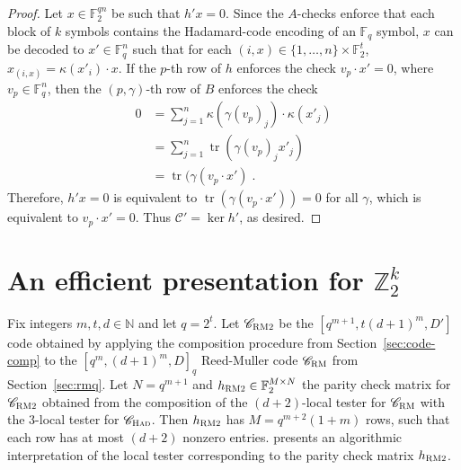 \documentclass[11pt]{article}
\theoremstyle{definition}
\newcommand{\code}{\mathscr{C}}
\newcommand{\N}{\ensuremath{\mathbb{N}}}
\newcommand{\F}{\ensuremath{\mathbb{F}}}
\newcommand{\Z}{\ensuremath{\mathbb{Z}}}
\newcommand{\RM}{\ensuremath{\textsc{RM}}}
\newcommand{\bRM}{\ensuremath{\textsc{RM2}}}
\newcommand{\had}{\textsc{Had}}
\DeclareMathOperator{\tr}{tr}
\begin{document}
\begin{proof}
Let $x\in \F_2^{qn}$ be such that $h'x=0$. Since the $A$-checks enforce that each block of $k$ symbols contains the Hadamard-code encoding of an $\F_q$ symbol, $x$ can be decoded to $x'\in \F_q^n$ such that for each $(i,x)\in \{1,\ldots,n\}\times \F_2^t$, $x_{(i,x)} = \kappa(x'_i)\cdot x$. If the $p$-th row of $h$ enforces the check $v_p\cdot x'=0$, where $v_p\in \F_q^n$, then 
the $(p,\gamma)$-th row of $B$ enforces the check 
\begin{align*}
0&=\sum_{j=1}^n \kappa(\gamma (v_p)_j) \cdot \kappa(x'_j)\\
&= \sum_{j=1}^n \tr( \gamma (v_p)_j x'_j) \\
&= \tr(\gamma (v_p\cdot  x')\;.
\end{align*}
Therefore, $h'x=0$ is equivalent to $\tr(\gamma(v_p \cdot x'))=0$ for all $\gamma$, which is equivalent to $v_p\cdot x'=0$. Thus $\code'=\ker h'$, as desired. 
\end{proof}

\section{An efficient presentation for $\Z_2^k$}
\label{sec:eff-z2k}

Fix integers $m,t,d \in \N$ and let $q=2^t$. Let $\code_{\bRM}$ be the $[q^{m+1},t(d+1)^m,D']$ code obtained by applying the composition procedure from Section~\ref{sec:code-comp} to the $[q^m,(d+1)^m,D]_q$ Reed-Muller code $\code_\RM$ from Section~\ref{sec:rmq}. Let $N=q^{m+1}$ and $h_{\bRM}\in \F_2^{M\times N}$ the parity check matrix for $\code_{\bRM}$ obtained from the composition of the $(d+2)$-local tester for $\code_\RM$ with the $3$-local tester for $\code_\had$. Then $h_\bRM$ has $M=  q^{m+2}(1+m)$ rows, such that each row has at most $(d+2)$ nonzero entries. 
 presents an algorithmic interpretation of the local tester corresponding to the parity check matrix $h_{\bRM}$. 

\end{document}
